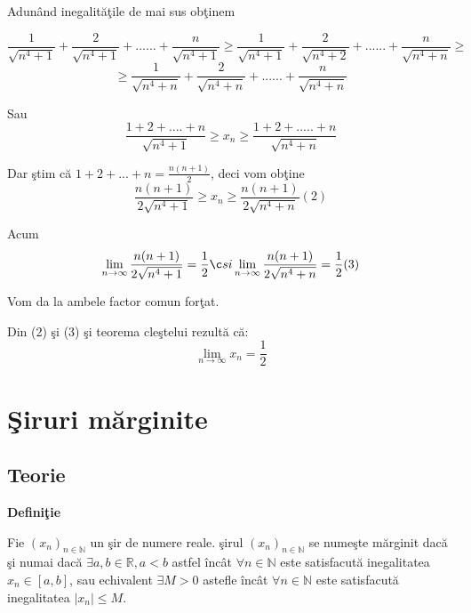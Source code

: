 \documentclass[a4paper,12pt,oneside]{report}
\begin{document}
\begin{enumerate}
Adun\^ and inegalit\u a\c tile de mai sus ob\c tinem 

\begin{displaymath}
  \frac{1}{\sqrt{n^{4}+1}}+ \frac{2}{\sqrt{n^{4}+1}}+......+ \frac{n}{\sqrt{n^{4}+1}} \geq \frac{1}{\sqrt{n^{4}+1}}+ \frac{2}{\sqrt{n^{4}+2}}+......+ \frac{n}{\sqrt{n^{4}+n}}\geq
\end{displaymath}
\begin{displaymath}
  \geq\frac{1}{\sqrt{n^{4}+n}}+ \frac{2}{\sqrt{n^{4}+n}}+......+ \frac{n}{\sqrt{n^{4}+n}}
\end{displaymath}


Sau
\begin{displaymath}
  \frac{1+2+....+n}{\sqrt{n^{4}+1}}\geq x_{n}\geq \frac{1+2+.....+n}{\sqrt{n^{4}+n}}
\end{displaymath}


Dar \c stim c\u a \(1+2+...+n = \frac{n(n+1)}{2}\), deci vom ob\c tine 
\begin{displaymath}
  \frac{n(n+1)}{2\sqrt{n^{4}+1}}\geq x_{n}\geq \frac{n(n+1)}{2\sqrt{n^{4}+n}} (2)
\end{displaymath}

Acum 
\begin{displaymath}
  \lim_{n \to \infty }\frac{n(n+1)}{2\sqrt{n^{4}+1}}=\frac{1}{2} \c si \lim_{n \to \infty }\frac{n(n+1)}{2\sqrt{n^{4}+n}}=\frac{1}{2} (3)
\end{displaymath}


Vom da la ambele factor comun for\c tat. 

Din (2) \c si (3) \c si teorema cle\c stelui rezult\u a c\u a:
\begin{displaymath}
  \lim_{n \to \infty }x_{n}=\frac{1}{2}
\end{displaymath}
\end{enumerate}


\chapter{\c Siruri m\u arginite}

\section{Teorie}

\textbf{Defini\c tie}

Fie \((x_{n})_{n\in \mathbb{N}}\) un \c sir de numere reale. \c sirul \((x_{n})_{n\in \mathbb{N}}\) se nume\c ste m\u arginit dac\u a \c si numai dac\u a \(\exists  a, b \in \mathbb{R}, a< b\) astfel \^ inc\^ at \(\forall n\in \mathbb{N}\) este satisfacut\u a inegalitatea \(x_{n}\in \left [ a,b \right ]\), sau echivalent \(\exists M> 0\) astefle \^ inc\^ at \(\forall  n\in \mathbb{N}\) este satisfacut\u a inegalitatea \(\left | x_{n} \right |\leq M\).
\end{document}
